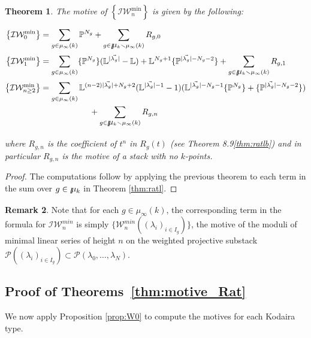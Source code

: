 \documentclass[a4paper,12pt]{amsart}
\newtheorem{thm}{Theorem}[section]
\theoremstyle{definition}
\newtheorem{rmk}[thm]{Remark}
\newcommand{\cW}{\mathcal{W}}
\newcommand{\cP}{\mathcal{P}}
\newcommand{\cI}{\mathcal{I}}
\newcommand{\Bmu}{\mbox{$\raisebox{-0.59ex}
		{$l$}\hspace{-0.18em}\mu\hspace{-0.88em}\raisebox{-0.98ex}{\scalebox{2}
			{$\color{white}.$}}\hspace{-0.416em}\raisebox{+0.88ex}
		{$\color{white}.$}\hspace{0.46em}$}{}}
\newcommand{\Ic}{\mathcal{I}}
\newcommand{\Pb}{\mathbb{P}}
\newcommand{\Lb}{\mathbb{L}}
\renewcommand{\setminus}{\smallsetminus}
\begin{document}
	
	\begin{thm}\label{thm:tbd10}
		The motive of $\left\{ \Ic\cW_{n}^{\mathrm{min}} \right\}$ is given by the following:
		
		\begin{align*}
			\left\{ \Ic\cW_{0}^{\mathrm{min}} \right\} &= \sum_{g \in \mu_\infty(k)} \Pb^{N_g} + \sum_{g \in \Bmu_k \setminus \mu_\infty(k)} R_{g,0} \\
			\left\{ \Ic\cW_{1}^{\mathrm{min}} \right\} &= 
			\sum_{g \in \mu_\infty(k)} \{\Pb^{N_g}\} ( \Lb^{|\vec{\lambda_{g}}|} - \Lb ) + \Lb^{{N_g}+1}\{\Pb^{|\vec{\lambda_{g}}|-{N_g}-2}\} + \sum_{g \in \Bmu_k \setminus \mu_{\infty}(k)} R_{g,1} \\
			\left\{ \Ic\cW_{n \ge 2}^{\mathrm{min}} \right\} &= 
			\sum_{g \in \mu_\infty(k)} \Lb^{(n-2)|\vec{\lambda_{g}}| + {N_g} + 2} ( \Lb^{|\vec{\lambda_{g}}|-1} - 1 ) ( \Lb^{|\vec{\lambda_{g}}|-{N_g}-1}\{\Pb^{N_g}\} + \{\Pb^{|\vec{\lambda_{g}}|-{N_g}-2}\} ) \\ & \quad \quad \quad \quad \quad \quad + \sum_{g \in \Bmu_k \setminus \mu_{\infty}(k)} R_{g,n}
		\end{align*}
		
		\noindent where $R_{g,n}$ is the coefficient of $t^n$ in $R_g(t)$ (see Theorem 8.9\ref{thm:ratlb}) and in particular $R_{g,n}$ is the motive of a stack with no $k$-points. 
	\end{thm}
	\begin{proof} The computations follow by applying the previous theorem to each term in the sum over $g \in \Bmu_k$ in Theorem \ref{thm:ratl}. 
	\end{proof} 
	
	\begin{rmk}
		Note that for each $g \in \mu_{\infty}(k)$, the corresponding term in the formula for $\cI \cW_n^{min}$ is simply $\{\cW_n^{min}((\lambda_i)_{i \in I_g})\}$, the motive of the moduli of minimal linear series of height $n$ on the weighted projective substack $\cP((\lambda_i)_{i \in I_g}) \subset \cP(\lambda_0, \ldots, \lambda_N)$.  
	\end{rmk}
	
	
	
	\subsection{Proof of Theorems~\ref{thm:motive_Rat}}
	
	We now apply Proposition \ref{prop:W0} to compute the motives for each Kodaira type. 
	
\end{document}
